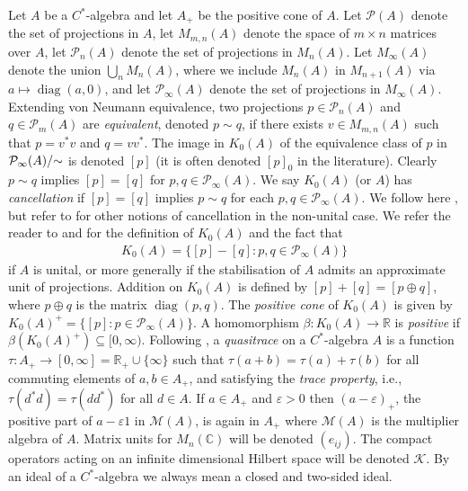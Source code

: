\documentclass[a4paper, 12pt]{amsart}
\numberwithin{equation}{section}
\theoremstyle{remark}
\theoremstyle{definition}
\begin{document}
Let $A$ be a $C^*$-algebra and let $A_+$ be the positive cone of $A$. Let ${\mathcal{P}}(A)$ denote
the set of projections in $A$, let $M_{m,n}(A)$ denote the space of $m\times n$ matrices
over $A$, let ${\mathcal{P}}_n(A)$ denote the set of projections in $M_n(A)$. Let $M_\infty(A)$
denote the union $\bigcup_n M_n(A)$, where we include $M_n(A)$ in $M_{n+1}(A)$ via
$a\mapsto {\operatorname{diag}}(a,0)$, and let ${\mathcal{P}}_\infty(A)$ denote the set of projections in
$M_\infty(A)$. Extending von Neumann equivalence, two projections $p\in {\mathcal{P}}_n(A)$ and
$q\in {\mathcal{P}}_m(A)$ are \emph{equivalent}, denoted $p\sim q$, if there exists $v\in
M_{m,n}(A)$ such that $p=v^*v$ and $q=vv^*$. The image in $K_0(A)$ of the equivalence class of $p$ in
${\mathcal{P}}_\infty(A)/{\negthickspace}\sim$ is denoted $[p]$ (it is often denoted $[p]_0$ in the
literature). Clearly $p\sim q$ implies $[p]=[q]$ for $p,q\in {\mathcal{P}}_\infty(A)$. We say
$K_0(A)$ (or $A$)  has \emph{cancellation} if $[p]=[q]$ implies $p\sim q$ for each
$p,q\in {\mathcal{P}}_\infty(A)$. We follow here \cite{MR3507995,Rai,MR2059808}, but refer to
\cite[V.2.4.13]{MR2188261} for other notions of cancellation in the non-unital case. We
refer the reader to \cite[V.1.1.18]{MR2188261} and \cite{MR1783408} for the definition of
$K_0(A)$ and the fact that
\begin{eqnarray}\label{eqn.K0A}
K_0(A)=\{[p]-[q]: p,q\in {\mathcal{P}}_\infty(A)\}
\end{eqnarray}
 if $A$ is unital, or more generally if the stabilisation of $A$ admits an approximate unit of projections. Addition on $K_0(A)$ is defined by $[p]+[q]=[p\oplus q]$, where $p\oplus q$ is the matrix ${\operatorname{diag}}(p,q)$. The \emph{positive cone} of $K_0(A)$ is given by $K_0(A)^+=\{[p]: p\in {\mathcal{P}}_\infty(A)\}$. A homomorphism $\beta\colon K_0(A)\to {\mathbb{R}}$ is \emph{positive} if $\beta(K_0(A)^+)\subseteq [0,\infty)$. Following \cite{MR2032998}, a \emph{quasitrace} on a $C^*$-algebra $A$ is a function $\tau\colon A_+\to [0,\infty]={\mathbb{R}}_+\cup\{\infty\}$ such that $\tau(a+b) = \tau(a)+\tau(b)$ for all commuting elements of $a,b\in A_+$, and satisfying the \emph{trace property}, i.e., $\tau(d^*d) = \tau(dd^*)$ for all $d \in A$. If $a \in A_+$ and $\varepsilon>0$ then $(a-\varepsilon)_+$, the positive part of $a - \varepsilon1$ in ${\mathcal{M}}(A)$, is again in $A_+$ where ${\mathcal{M}}(A)$ is the multiplier algebra of $A$. Matrix units for $M_n({\mathbb{C}})$ will be denoted  $(e_{ij})$. The compact operators acting on an infinite dimensional Hilbert space will be denoted ${\mathcal{K}}$. By an ideal of a $C^*$-algebra we always mean a closed and two-sided ideal.
\end{document}
